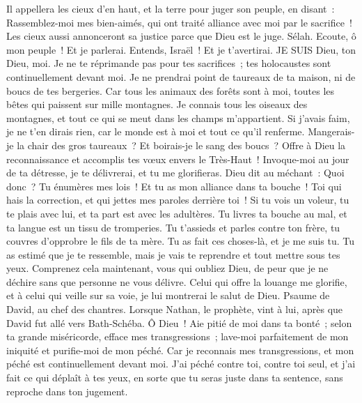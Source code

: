 \begin{multicols}{2}
Il appellera les cieux d'en haut, et la terre pour juger son peuple, en disant~:
Rassemblez-moi mes bien-aimés, qui ont traité alliance avec moi par le sacrifice~!
Les cieux aussi annonceront sa justice parce que Dieu est le juge. Sélah.
Ecoute, ô mon peuple~! Et je parlerai. Entends, Israël~! Et je t'avertirai. JE SUIS Dieu, ton Dieu, moi.
Je ne te réprimande pas pour tes sacrifices~; tes holocaustes sont continuellement devant moi.
Je ne prendrai point de taureaux de ta maison, ni de boucs de tes bergeries.
Car tous les animaux des forêts sont à moi, toutes les bêtes qui paissent sur mille montagnes.
Je connais tous les oiseaux des montagnes, et tout ce qui se meut dans les champs m'appartient.
Si j'avais faim, je ne t'en dirais rien, car le monde est à moi et tout ce qu'il renferme.
Mangerais-je la chair des gros taureaux~? Et boirais-je le sang des boucs~?
Offre à Dieu la reconnaissance et accomplis tes vœux envers le Très-Haut~!
Invoque-moi au jour de ta détresse, je te délivrerai, et tu me glorifieras.
Dieu dit au méchant~: Quoi donc~? Tu énumères mes lois~! Et tu as mon alliance dans ta bouche~!
Toi qui hais la correction, et qui jettes mes paroles derrière toi~!
Si tu vois un voleur, tu te plais avec lui, et ta part est avec les adultères.
Tu livres ta bouche au mal, et ta langue est un tissu de tromperies.
Tu t'assieds et parles contre ton frère, tu couvres d'opprobre le fils de ta mère.
Tu as fait ces choses-là, et je me suis tu. Tu as estimé que je te ressemble, mais je vais te reprendre et tout mettre sous tes yeux.
Comprenez cela maintenant, vous qui oubliez Dieu, de peur que je ne déchire sans que personne ne vous délivre.
Celui qui offre la louange me glorifie, et à celui qui veille sur sa voie, je lui montrerai le salut de Dieu.
\VerseOne{}Psaume de David, au chef des chantres.
Lorsque Nathan, le prophète, vint à lui, après que David fut allé vers Bath-Schéba.
Ô Dieu~! Aie pitié de moi dans ta bonté~; selon ta grande miséricorde, efface mes transgressions~;
lave-moi parfaitement de mon iniquité et purifie-moi de mon péché.
Car je reconnais mes transgressions, et mon péché est continuellement devant moi.
J'ai péché contre toi, contre toi seul, et j'ai fait ce qui déplaît à tes yeux, en sorte que tu seras juste dans ta sentence, sans reproche dans ton jugement.

\end{multicols}

